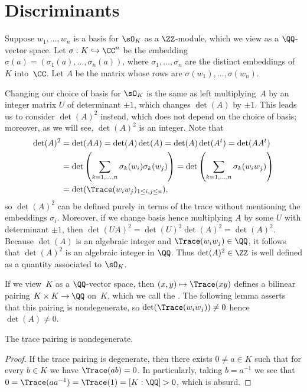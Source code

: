 \section{Discriminants}\label{sec:disc}

Suppose $w_1,\dots, w_n$ is a basis for $\sO_K$ as a $\ZZ$-module,
which we view as a $\QQ$-vector space.  Let $\sigma: K \hookrightarrow \CC^n$ be
the embedding $\sigma(a)=(\sigma_1(a),\dots,\sigma_n(a))$, where
$\sigma_1,\dots, \sigma_n$ are the distinct embeddings of $K$
into~$\CC$.  Let $A$ be the matrix whose rows are $\sigma(w_1), \dots,
\sigma(w_n)$.

Changing our choice of
basis for $\sO_K$ is the same as left multiplying~$A$ by an integer
matrix $U$ of determinant $\pm 1$, which changes
$\det(A)$ by $\pm 1$.
This leads us to consider $\det(A)^2$ instead, which does not depend
on the choice of basis; moreover, as we will see, $\det(A)^2$ is an integer.
Note that
\begin{align*}
  \det(A)^2 &= \det(AA) =
  \det(A)\det(A) = \det(A)\det(A^t) =
  \det(A A^t) \\
  &= \det\left(\sum_{k=1,\dots,n} \sigma_k(w_i)\sigma_k(w_j)\right)
  = \det\left(\sum_{k=1,\dots,n} \sigma_k(w_i w_j)\right)\\
  &= \det(\Trace(w_i w_j)_{1\leq i,j\leq n}),
\end{align*}
so $\det(A)^2$ can be defined purely in terms of the trace without
mentioning the embeddings $\sigma_i$.
Moreover, if we change basis hence multiplying $A$ by some $U$ with determinant $\pm 1$, then
$\det(UA)^2 = \det(U)^2\det(A)^2 = \det(A)^2$.
Because $\det(A)$ is an algebraic integer and $\Trace(w_iw_j)\in\QQ$, it follows
that $\det(A)^2$ is an algebraic integer in $\QQ$.
Thus $\det(A)^2\in \ZZ$ is well defined as a quantity associated to $\sO_K$.

If we view~$K$ as a $\QQ$-vector space, then $(x,y)\mapsto \Trace(xy)$
defines a bilinear pairing $K\times K \to \QQ$ on~$K$, which we call
the .  The following lemma asserts that this
pairing is nondegenerate, so $\det(\Trace(w_i w_j))\neq 0$ hence
$\det(A)\neq 0$.
\begin{lemma}\label{lem:tracenondegen}
  The trace pairing is nondegenerate.
\end{lemma}
\begin{proof}
  If the trace pairing is degenerate, then there exists $0\neq a\in K$ such
  that for every $b\in K$ we have $\Trace(ab)=0$.  In particularly, taking
  $b=a^{-1}$ we see that $0=\Trace(a a^{-1})=\Trace(1)=[K:\QQ]>0$, which is
  absurd.
\end{proof}

